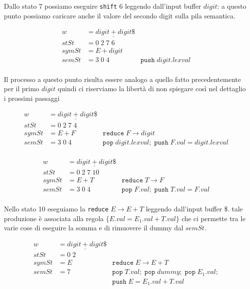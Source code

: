 \documentclass[class=book, crop=false, oneside, 12pt]{standalone}
\begin{document}
Dallo stato 7 possiamo eseguire \texttt{shift} 6 leggendo dall'input buffer \(digit\): a questo punto possiamo caricare anche il valore del secondo digit sulla pila semantica. 

\begin{align*}
    w &= \underline{digit + digit}\$ \\
    stSt &= 0\; 2\; 7\; 6 \\
    symSt &= E + digit \\     
    semSt &= 3\; 0\; 4 &\texttt{push}\;digit.lexval\\
\end{align*}

Il processo a questo punto risulta essere analogo a quello fatto precedentemente per il primo \(digit\) quindi ci riserviamo la libertà di non spiegare così nel dettaglio i prossimi passaggi 

\begin{align*}
    w &= \underline{digit + digit}\$ \\
    stSt &= 0\; 2\; 7\; 4 \\
    symSt &= E + F &\texttt{reduce}\; F \to digit\\     
    semSt &= 3\; 0\; 4 &\texttt{pop}\;digit.lexval;\; \texttt{push}\;F.val = digit.lexval\\
\end{align*}

\begin{align*}
    w &= \underline{digit + digit}\$ \\
    stSt &= 0\; 2\; 7\; 10 \\
    symSt &= E + T &\texttt{reduce}\; T \to F\\     
    semSt &= 3\; 0\; 4 &\texttt{pop}\;F.val;\; \texttt{push}\;T.val = F.val\\
\end{align*}

Nello stato 10 eseguiamo la \texttt{reduce} \(E \to E + T\) leggendo dall'input buffer \$. tale produzione è associata alla regola \(\{E.val = E_1.val + T.val\}\) che ci permette tra le varie cose di eseguire la somma e di rimuovere il dummy dal \(semSt\).

\begin{align*}
    w &= \underline{digit + digit}\$ \\
    stSt &= 0\; 2 \\
    symSt &= E &\texttt{reduce}\; E \to E + T\\     
    semSt &= 7 &\texttt{pop}\;T.val;\; \texttt{pop}\;dummy;\; \texttt{pop}\;E_1.val;\\ 
    && \texttt{push}\;E = E_1.val + T.val\\
\end{align*}
\end{document}

